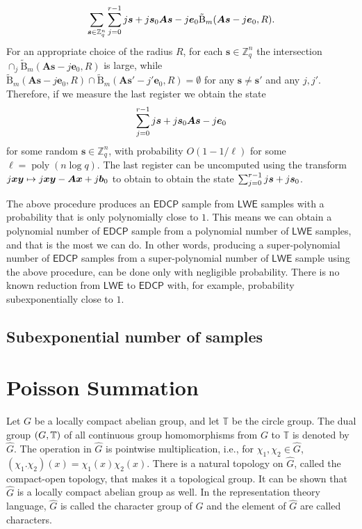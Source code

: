 \documentclass[11pt]{article}
\theoremstyle{plain}
\theoremstyle{definition}
\DeclareMathOperator{\poly}{poly}
\let\hom\relax
\DeclareMathOperator{\hom}{Hom}
\let\ket\relax
\DeclarePairedDelimiter{\ket}{\lvert}{\rangle}
\def\Z{\mathbb{Z}}
\def\lwe{\mathsf{LWE}}
\def\edcp{\mathsf{EDCP}}
\begin{document}
\[ \sum_{\bm{s} \in \Z_q^n} \sum_{j = 0}^{r - 1} \ket{j}\ket{\bm{s} + j\bm{s}_0}\ket{\bm{As} - j\bm{e}_0}\ket{\tilde{\mathrm{B}}_m(\bm{As} - j\bm{e}_0, R)}. \]
For an appropriate choice of the radius $R$, for each $\bm{s} \in \Z_q^n$ the intersection $\cap_{j} \tilde{\mathrm{B}}_m(\bm{As} - j\bm{e}_0, R)$ is large, while $\tilde{\mathrm{B}}_m(\bm{As} - j\bm{e}_0, R) \cap \tilde{\mathrm{B}}_m(\bm{As}' - j'\bm{e}_0, R) = \emptyset$ for any $\bm{s} \ne \bm{s}'$ and any $j, j'$. Therefore, if we measure the last register we obtain the state
\[ \sum_{j = 0}^{r - 1} \ket{j}\ket{\bm{s} + j\bm{s}_0}\ket{\bm{As} - j\bm{e}_0} \]
for some random $\bm{s} \in \Z_q^n$, with probability $O(1 - 1 / \ell)$ for some $\ell = \poly(n\log q)$. The last register can be uncomputed using the transform $\ket{j}\ket{\bm{x}}\ket{\bm{y}} \mapsto \ket{j}\ket{\bm{x}}\ket{\bm{y} - \bm{Ax} + j\bm{b}_0}$ to obtain to obtain the state $\sum_{j = 0}^{r - 1} \ket{j}\ket{\bm{s} + j\bm{s}_0}$.

The above procedure produces an $\edcp$ sample from $\lwe$ samples with a probability that is only polynomially close to $1$. This means we can obtain a polynomial number of $\edcp$ sample from a polynomial number of $\lwe$ samples, and that is the most we can do. In other words, producing a super-polynomial number of $\edcp$ samples from a super-polynomial number of $\lwe$ sample using the above procedure, can be done only with negligible probability. There is no known reduction from $\lwe$ to $\edcp$ with, for example, probability subexponentially close to $1$.


\subsection{Subexponential number of samples}
\label{sec:hardness-poly}











\appendix

\section{Poisson Summation}
Let $G$ be a locally compact abelian group, and let $\mathbb{T}$ be the circle group. The dual group $\hom(G, \mathbb{T})$ of all continuous group homomorphisms from $G$ to $\mathbb{T}$ is denoted by $\widehat{G}$. The operation in $\widehat{G}$ is pointwise multiplication, i.e., for $\chi_1, \chi_2 \in \widehat{G}$, $(\chi_1 . \chi_2)(x) = \chi_1(x)\chi_2(x)$. There is a natural topology on $\widehat{G}$, called the compact-open topology, that makes it a topological group. It can be shown that $\widehat{G}$ is a locally compact abelian group as well. In the representation theory language, $\widehat{G}$ is called the character group of $G$ and the element of $\widehat{G}$ are called characters. 
\end{document}
